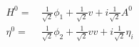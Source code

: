\begin{align} 
H^0 = & \, \frac{1}{\sqrt{2}} \phi_1  + \frac{1}{\sqrt{2}} v  + i \frac{1}{\sqrt{2}} A^0 \\ 
\eta^0 = & \, \frac{1}{\sqrt{2}} \phi_2  + \frac{1}{\sqrt{2}} vv  + i \frac{1}{\sqrt{2}} \eta_i 
\end{align} 
